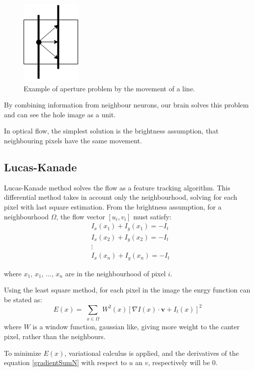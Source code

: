 \documentclass[12pt,a4paper,twoside]{report}
\begin{document}
\begin{figure}
	\label{apertureimg}
	\centering
	\includegraphics{img/Aperture}
	\caption{Example of aperture problem by the movement of a line.}
\end{figure}

 By combining information from neighbour neurons, our brain solves this problem and can see the hole image as a unit.

In optical flow, the simplest solution is the brightness assumption, that neighbouring pixels have the same movement.

\subsection{Lucas-Kanade}
Lucas-Kanade method solves the flow as a feature tracking algorithm. This differential method takes in account only the neighbourhood, solving for each pixel with last square estimation. From the brightness assumption, for a neighbourhood $\Omega$, the flow vector $[u_i,v_i]$ must satisfy: 
\begin{equation}
\begin{split}
	&I_x(x_1)+I_y(x_1) = - I_t	\\
	&I_x(x_2)+I_y(x_2) = - I_t \\
	&\vdots \\
	&I_x(x_n)+I_y(x_n) = - I_t 
	\end{split}
\end{equation} 

where $x_1$, $x_1$,  $...$,  $x_n$ are in the neighbourhood of pixel $i$.

Using the least square method, for each pixel in the image the enrgy function can be stated as:
\begin{equation} \label{gradientSumN}
	E(x) = \sum_{\substack{x \in \Omega}}
	 W^2(x)[\nabla I(x)\cdot \boldsymbol{v}+I_t(x)]^2
\end{equation}
where $W$ is a window function, gaussian like, giving more weight to the canter pixel, rather than the neighbours.

To minimize $E(x)$, variational calculus is applied, and the derivatives of the equation \ref{gradientSumN} with respect to $u$ an $v$, respectively will be 0.
\end{document}
